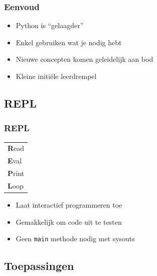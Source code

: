 \begin{frame}
  \frametitle{Eenvoud}
  \begin{itemize}
    \item Python is ``gelaagder''
    \item Enkel gebruiken wat je nodig hebt
    \item Nieuwe concepten komen geleidelijk aan bod
    \item Kleine initi\"ele leerdrempel
  \end{itemize}
\end{frame}

\subsection{REPL}

\frame{\tableofcontents[currentsubsection]}

\begin{frame}
  \frametitle{REPL}
  \begin{center}
    \begin{tabular}{l}
      \textbf{R}ead \\
      \textbf{E}val \\
      \textbf{P}rint \\
      \textbf{L}oop
    \end{tabular}
  \end{center}
  \begin{itemize}
    \item Laat interactief programmeren toe
    \item Gemakkelijk om code uit te testen
    \item Geen \texttt{main} methode nodig met sysouts
  \end{itemize}
\end{frame}


\subsection{Toepassingen}

\frame{\tableofcontents[currentsubsection]}

